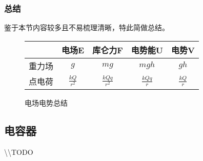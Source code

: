 \subsubsection{总结}

鉴于本节内容较多且不易梳理清晰，特此简做总结。
\begin{figure}[ht!]
    \centering
    \renewcommand\arraystretch{1.5}
    \begin{tabular}{c|c|c|c|c}
        \hline
        &电场E&库仑力F&电势能U&电势V\\\hline
        重力场&$g$&$mg$&$mgh$&$gh$\\\hline
        点电荷&$\frac{kQ}{r^2}$&$\frac{kQq}{r^2}$&$\frac{kQq}{r}$&$\frac{kQ}{r}$\\\hline
    \end{tabular}
    \caption{电场电势总结}
\end{figure}

\subsection{电容器}

\textbackslash\textbackslash TODO
